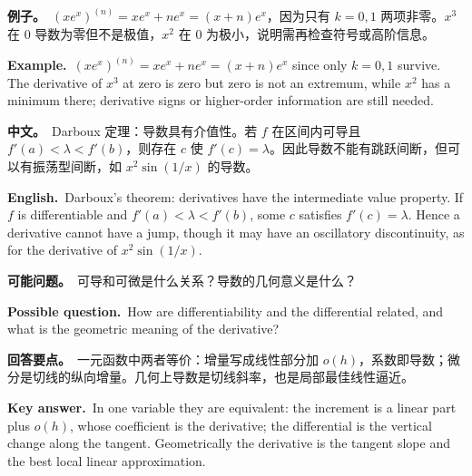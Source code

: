 \documentclass[UTF8,11pt,a4paper]{ctexart}
\newcommand{\BOTH}[2]{\par\noindent\textbf{中文。}\ #1\par\noindent\textbf{English.}\ #2\par}
\newcommand{\EX}[2]{\par\noindent\textbf{例子。}\ #1\par\noindent\textbf{Example.}\ #2\par}
\newcommand{\ASK}[4]{\begin{samepage}\par\noindent\textbf{可能问题。}\ #1\par\noindent\textbf{Possible question.}\ #2\par\noindent\textbf{回答要点。}\ #3\par\noindent\textbf{Key answer.}\ #4\medskip\end{samepage}}
\begin{document}
\EX{$(xe^x)^{(n)}=xe^x+ne^x=(x+n)e^x$，因为只有 $k=0,1$ 两项非零。$x^3$ 在 $0$ 导数为零但不是极值，$x^2$ 在 $0$ 为极小，说明需再检查符号或高阶信息。}{$(xe^x)^{(n)}=xe^x+ne^x=(x+n)e^x$ since only $k=0,1$ survive. The derivative of $x^3$ at zero is zero but zero is not an extremum, while $x^2$ has a minimum there; derivative signs or higher-order information are still needed.}
\BOTH{Darboux 定理：导数具有介值性。若 $f$ 在区间内可导且 $f'(a)<\lambda<f'(b)$，则存在 $c$ 使 $f'(c)=\lambda$。因此导数不能有跳跃间断，但可以有振荡型间断，如 $x^2\sin(1/x)$ 的导数。}{Darboux's theorem: derivatives have the intermediate value property. If $f$ is differentiable and $f'(a)<\lambda<f'(b)$, some $c$ satisfies $f'(c)=\lambda$. Hence a derivative cannot have a jump, though it may have an oscillatory discontinuity, as for the derivative of $x^2\sin(1/x)$.}
\ASK{可导和可微是什么关系？导数的几何意义是什么？}{How are differentiability and the differential related, and what is the geometric meaning of the derivative?}{一元函数中两者等价：增量写成线性部分加 $o(h)$，系数即导数；微分是切线的纵向增量。几何上导数是切线斜率，也是局部最佳线性逼近。}{In one variable they are equivalent: the increment is a linear part plus $o(h)$, whose coefficient is the derivative; the differential is the vertical change along the tangent. Geometrically the derivative is the tangent slope and the best local linear approximation.}
\end{document}
